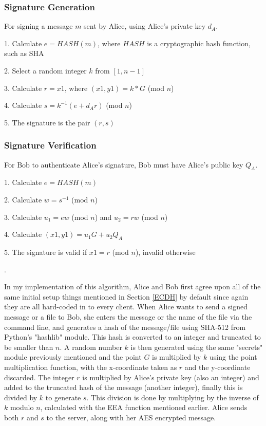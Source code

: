\documentclass[12pt,a4paper]{article}
\begin{document}
\subsubsection{Signature Generation} \label{Signature Generation}
For signing a message $m$ sent by Alice, using Alice's private key $d_A$.

1. Calculate $e = HASH(m)$, where $HASH$ is a cryptographic hash function, such as SHA

2. Select a random integer $k$ from $[1,n-1]$

3. Calculate $r = x1$, where $(x1,y1) = k * G$ (mod $n$)

4. Calculate $s = k^{-1}(e+d_Ar)$ (mod $n$)

5. The signature is the pair $(r,s)$

\subsubsection{Signature Verification} \label{Signature Verification}
For Bob to authenticate Alice's signature, Bob must have Alice's public key $Q_A$.

1. Calculate $e = HASH(m)$

2. Calculate $w = s^{-1}$ (mod $n$)

3. Calculate $u_1 = ew$ (mod $n$) and $u_2 = rw$ (mod $n$)

4. Calculate $(x1,y1) = u_1G + u_2Q_A$

5. The signature is valid if $x1 = r$ (mod $n$), invalid otherwise

\cite{jurivsic1997elliptic,koblitz2000state,hankerson2003guide,anoop2007elliptic,silverman2009arithmetic,brown2009standards}.

In my implementation of this algorithm, Alice and Bob first agree upon all of the same initial setup things mentioned in Section \ref{ECDH} 
by default since again they are all hard-coded in to every client. 
When Alice wants to send a signed message or a file to Bob, she enters the message or the name of the file via the command line, 
and generates a hash of the message/file using SHA-512 from Python's "hashlib" module. 
This hash is converted to an integer and truncated to be smaller than $n$. 
A random number $k$ is then generated using the same "secrets" module previously mentioned and the point $G$ is multiplied by $k$ using 
the point multiplication function, with the x-coordinate taken as $r$ and the y-coordinate discarded. 
The integer $r$ is multiplied by Alice's private key (also an integer) and added to the truncated hash of the message (another integer), 
finally this is divided by $k$ to generate $s$. 
This division is done by multiplying by the inverse of $k$ modulo $n$, calculated with the EEA function mentioned earlier. 
Alice sends both $r$ and $s$ to the server, along with her AES encrypted message. 
\end{document}

